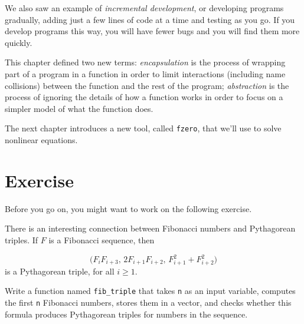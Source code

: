 We also saw an example of \emph{incremental development}, or developing programs gradually, adding just a few lines of code at a time and testing as you go.  If you develop programs this way, you will have fewer bugs and you will find them more quickly.

This chapter defined two new terms: \emph{encapsulation} is the process of wrapping part of a program in
a function in order to limit interactions (including name collisions)
between the function and the rest of the program; \emph{abstraction} is the process of ignoring the details of how a function works in order to focus on a simpler model of what the
function does.

The next chapter introduces a new tool, called \lstinline{fzero}, that we'll use to solve nonlinear equations.


\section{Exercise}

Before you go on, you might want to work on the following exercise.

\begin{ex}

There is an interesting connection between Fibonacci numbers and
Pythagorean triples.  If $F$ is a Fibonacci sequence, then

\begin{equation*}
\big(F_i F_{i+3}, \, 2 F_{i+1} F_{i+2}, \, F_{i+1}^2 + F_{i+2}^2 \big)
\end{equation*}
is a Pythagorean triple, for all $i \ge 1$.

Write a function named \lstinline{fib_triple} that
takes \lstinline{n} as an input variable, computes
the first \lstinline{n} Fibonacci numbers, stores them in a vector,
and checks whether this formula produces Pythagorean triples for numbers in the \mbox{sequence}.


\end{ex}
